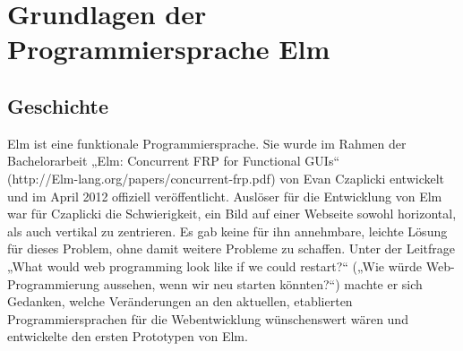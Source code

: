 \section{Grundlagen der Programmiersprache Elm}
\label{sec:Was ist Elm?}

\subsection{Geschichte}
\label{sec:Geschichte}
Elm ist eine funktionale Programmiersprache. Sie wurde im Rahmen der Bachelorarbeit „Elm: Concurrent FRP for Functional GUIs“\\
 (http://Elm-lang.org/papers/concurrent-frp.pdf)
von Evan Czaplicki entwickelt und im April 2012 offiziell veröffentlicht.
Auslöser für die Entwicklung von Elm war für Czaplicki die Schwierigkeit, ein Bild auf einer Webseite sowohl horizontal, als auch vertikal zu zentrieren. Es gab keine für ihn annehmbare, leichte Lösung für dieses Problem, ohne damit weitere Probleme zu schaffen. Unter der Leitfrage „What would web programming look like if we could restart?“ („Wie würde Web-Programmierung aussehen, wenn wir neu starten könnten?“) machte er sich Gedanken, welche Veränderungen an den aktuellen, etablierten Programmiersprachen für die Webentwicklung wünschenswert wären und entwickelte den ersten Prototypen von Elm.

